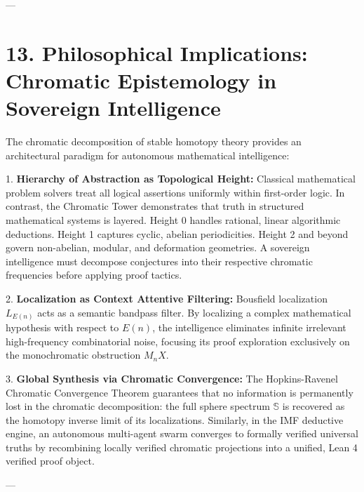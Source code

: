 \documentclass[11pt,twoside,openright]{amsbook}
\begin{document}
---

\section{13. Philosophical Implications: Chromatic Epistemology in Sovereign Intelligence}

The chromatic decomposition of stable homotopy theory provides an architectural paradigm for autonomous mathematical intelligence:

1. \textbf{Hierarchy of Abstraction as Topological Height:}
   Classical mathematical problem solvers treat all logical assertions uniformly within first-order logic. In contrast, the Chromatic Tower demonstrates that truth in structured mathematical systems is layered. Height 0 handles rational, linear algorithmic deductions. Height 1 captures cyclic, abelian periodicities. Height 2 and beyond govern non-abelian, modular, and deformation geometries. A sovereign intelligence must decompose conjectures into their respective chromatic frequencies before applying proof tactics.

2. \textbf{Localization as Context Attentive Filtering:}
   Bousfield localization $L_{E(n)}$ acts as a semantic bandpass filter. By localizing a complex mathematical hypothesis with respect to $E(n)$, the intelligence eliminates infinite irrelevant high-frequency combinatorial noise, focusing its proof exploration exclusively on the monochromatic obstruction $M_n X$.

3. \textbf{Global Synthesis via Chromatic Convergence:}
   The Hopkins-Ravenel Chromatic Convergence Theorem guarantees that no information is permanently lost in the chromatic decomposition: the full sphere spectrum $\mathbb{S}$ is recovered as the homotopy inverse limit of its localizations. Similarly, in the IMF deductive engine, an autonomous multi-agent swarm converges to formally verified universal truths by recombining locally verified chromatic projections into a unified, Lean 4 verified proof object.

---
\end{document}

